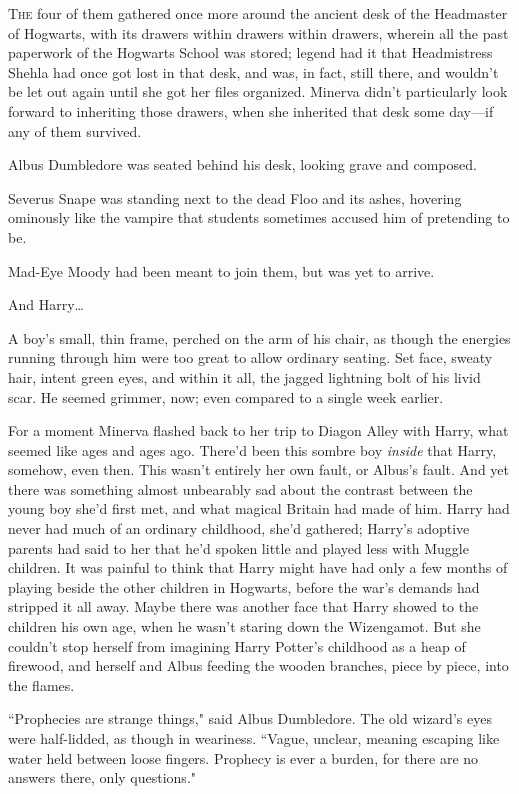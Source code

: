 \lettrine{T}{he} four of them gathered once more around the ancient desk of the Headmaster of Hogwarts, with its drawers within drawers within drawers, wherein all the past paperwork of the Hogwarts School was stored; legend had it that Headmistress Shehla had once got lost in that desk, and was, in fact, still there, and wouldn't be let out again until she got her files organized. Minerva didn't particularly look forward to inheriting those drawers, when she inherited that desk some day—if any of them survived.

Albus Dumbledore was seated behind his desk, looking grave and composed.

Severus Snape was standing next to the dead Floo and its ashes, hovering ominously like the vampire that students sometimes accused him of pretending to be.

Mad-Eye Moody had been meant to join them, but was yet to arrive.

And Harry{\ldots}

A boy's small, thin frame, perched on the arm of his chair, as though the energies running through him were too great to allow ordinary seating. Set face, sweaty hair, intent green eyes, and within it all, the jagged lightning bolt of his livid scar. He seemed grimmer, now; even compared to a single week earlier.

For a moment Minerva flashed back to her trip to Diagon Alley with Harry, what seemed like ages and ages ago. There'd been this sombre boy \emph{inside} that Harry, somehow, even then. This wasn't entirely her own fault, or Albus's fault. And yet there was something almost unbearably sad about the contrast between the young boy she'd first met, and what magical Britain had made of him. Harry had never had much of an ordinary childhood, she'd gathered; Harry's adoptive parents had said to her that he'd spoken little and played less with Muggle children. It was painful to think that Harry might have had only a few months of playing beside the other children in Hogwarts, before the war's demands had stripped it all away. Maybe there was another face that Harry showed to the children his own age, when he wasn't staring down the Wizengamot. But she couldn't stop herself from imagining Harry Potter's childhood as a heap of firewood, and herself and Albus feeding the wooden branches, piece by piece, into the flames.

``Prophecies are strange things," said Albus Dumbledore. The old wizard's eyes were half-lidded, as though in weariness. ``Vague, unclear, meaning escaping like water held between loose fingers. Prophecy is ever a burden, for there are no answers there, only questions."

